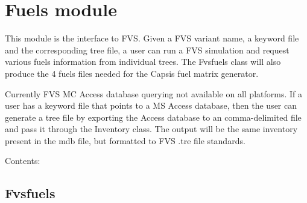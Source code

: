 \documentclass[letterpaper,10pt,english]{sphinxmanual}
\begin{document}
\section{Fuels module}
\label{fuels:module-fuels}\label{fuels::doc}\label{fuels:fuels-module}
This module is the interface to FVS. Given a FVS variant name, a keyword file
and the corresponding tree file, a user can run a FVS simulation and request
various fuels information from individual trees. The Fvsfuels class will also
produce the 4 fuels files needed for the Capsis fuel matrix generator.

Currently FVS MC Access database querying not available on all platforms. 
If a user has a keyword file that points to a MS Access database, then the user
can generate a tree file by exporting the Access database to an comma-delimited
file and pass it through the Inventory class. The output will be the same
inventory present in the mdb file, but formatted to FVS .tre file standards.

Contents:


\subsection{Fvsfuels}
\label{fuels_Fvsfuels::doc}\label{fuels_Fvsfuels:fvsfuels}
\noindent{}
\end{document}

